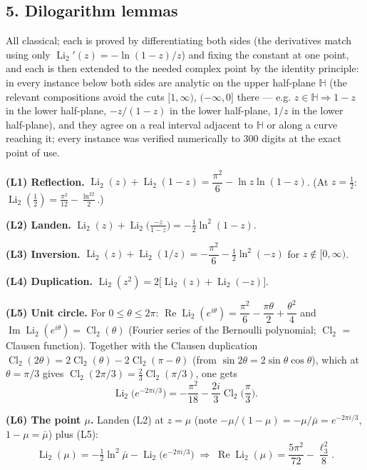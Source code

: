 \documentclass[11pt]{article}
\theoremstyle{remark}
\begin{document}
\subsection*{5. Dilogarithm lemmas}

All classical; each is proved by differentiating both sides (the derivatives match using only $\operatorname{Li}_2'(z)=-\ln(1-z)/z$) and fixing the constant at one point, and each is then extended to the needed complex point by the identity principle: in every instance below both sides are analytic on the upper half-plane $\mathbb H$ (the relevant compositions avoid the cuts $[1,\infty)$, $(-\infty,0]$ there --- e.g. $z\in\mathbb H\Rightarrow 1-z$ in the lower half-plane, $-z/(1-z)$ in the lower half-plane, $1/z$ in the lower half-plane), and they agree on a real interval adjacent to $\mathbb H$ or along a curve reaching it; every instance was verified numerically to $300$ digits at the exact point of use.

\textbf{(L1) Reflection.} $\operatorname{Li}_2(z)+\operatorname{Li}_2(1-z)=\dfrac{\pi^2}6-\ln z\ln(1-z)$. (At $z=\tfrac12$: $\operatorname{Li}_2(\tfrac12)=\tfrac{\pi^2}{12}-\tfrac{\ln^22}2$.)

\textbf{(L2) Landen.} $\operatorname{Li}_2(z)+\operatorname{Li}_2\!\big(\tfrac{-z}{1-z}\big)=-\tfrac12\ln^2(1-z)$.

\textbf{(L3) Inversion.} $\operatorname{Li}_2(z)+\operatorname{Li}_2(1/z)=-\dfrac{\pi^2}6-\tfrac12\ln^2(-z)$ for $z\notin[0,\infty)$.

\textbf{(L4) Duplication.} $\operatorname{Li}_2(z^2)=2\big[\operatorname{Li}_2(z)+\operatorname{Li}_2(-z)\big]$.

\textbf{(L5) Unit circle.} For $0\le\theta\le2\pi$:
$\operatorname{Re}\operatorname{Li}_2(e^{i\theta})=\dfrac{\pi^2}6-\dfrac{\pi\theta}2+\dfrac{\theta^2}4$ and $\operatorname{Im}\operatorname{Li}_2(e^{i\theta})=\operatorname{Cl}_2(\theta)$
(Fourier series of the Bernoulli polynomial; $\operatorname{Cl}_2$ = Clausen function). Together with the Clausen duplication $\operatorname{Cl}_2(2\theta)=2\operatorname{Cl}_2(\theta)-2\operatorname{Cl}_2(\pi-\theta)$ (from $\sin2\theta=2\sin\theta\cos\theta$), which at $\theta=\pi/3$ gives $\operatorname{Cl}_2(2\pi/3)=\tfrac23\operatorname{Cl}_2(\pi/3)$, one gets
\[
\operatorname{Li}_2\!\big(e^{-2\pi i/3}\big)=-\frac{\pi^2}{18}-\frac{2i}{3}\operatorname{Cl}_2\!\Big(\frac\pi3\Big).
\]

\textbf{(L6) The point $\mu$.} Landen (L2) at $z=\mu$ (note $-\mu/(1-\mu)=-\mu/\bar\mu=e^{-2\pi i/3}$, $1-\mu=\bar\mu$) plus (L5):
\[
\operatorname{Li}_2(\mu)=-\tfrac12\ln^2\bar\mu-\operatorname{Li}_2\!\big(e^{-2\pi i/3}\big)
\;\Longrightarrow\;
\operatorname{Re}\operatorname{Li}_2(\mu)=\frac{5\pi^2}{72}-\frac{\ell_3^2}{8}.
\]
\end{document}
